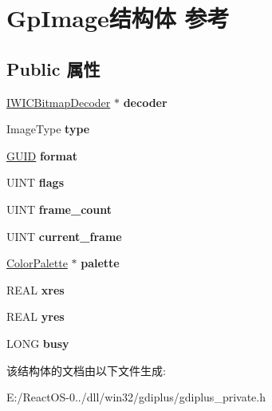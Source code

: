 \hypertarget{struct_gp_image}{}\section{Gp\+Image结构体 参考}
\label{struct_gp_image}
\subsection*{Public 属性}
\begin{DoxyCompactItemize}
\item 
\mbox{\label{struct_gp_image_a0841b48b2203eb21191d23a2fa2cfd97}} 
\hyperlink{interface_i_w_i_c_bitmap_decoder}{I\+W\+I\+C\+Bitmap\+Decoder} $\ast$ {\bfseries decoder}
\item 
\mbox{\label{struct_gp_image_a99ac9bd65d9494b11c3951a41c8a3e05}} 
Image\+Type {\bfseries type}
\item 
\mbox{\label{struct_gp_image_a84fbeaa1a68d0b773f4cb5c8246432f5}} 
\hyperlink{interface_g_u_i_d}{G\+U\+ID} {\bfseries format}
\item 
\mbox{\label{struct_gp_image_acc317c821452e8cd9c1528079c64061f}} 
U\+I\+NT {\bfseries flags}
\item 
\mbox{\label{struct_gp_image_a22ba42a41ec56cba4a697fe8758e42f5}} 
U\+I\+NT {\bfseries frame\+\_\+count}
\item 
\mbox{\label{struct_gp_image_a9bfd99c212a81f44aeddf66732fabac9}} 
U\+I\+NT {\bfseries current\+\_\+frame}
\item 
\mbox{\label{struct_gp_image_a0de323981e31ef3a721b3415a80a981e}} 
\hyperlink{struct_color_palette}{Color\+Palette} $\ast$ {\bfseries palette}
\item 
\mbox{\label{struct_gp_image_af57d6c7281d16cadff9c5810c671a20d}} 
R\+E\+AL {\bfseries xres}
\item 
\mbox{\label{struct_gp_image_a625e05ccd8373cd27ea2d478790adb2d}} 
R\+E\+AL {\bfseries yres}
\item 
\mbox{\label{struct_gp_image_aad4ecfa0f15cfb48b25dedda7535a86c}} 
L\+O\+NG {\bfseries busy}
\end{DoxyCompactItemize}


该结构体的文档由以下文件生成\+:\begin{DoxyCompactItemize}
\item 
E\+:/\+React\+O\+S-\/0../dll/win32/gdiplus/gdiplus\+\_\+private.\+h\end{DoxyCompactItemize}
